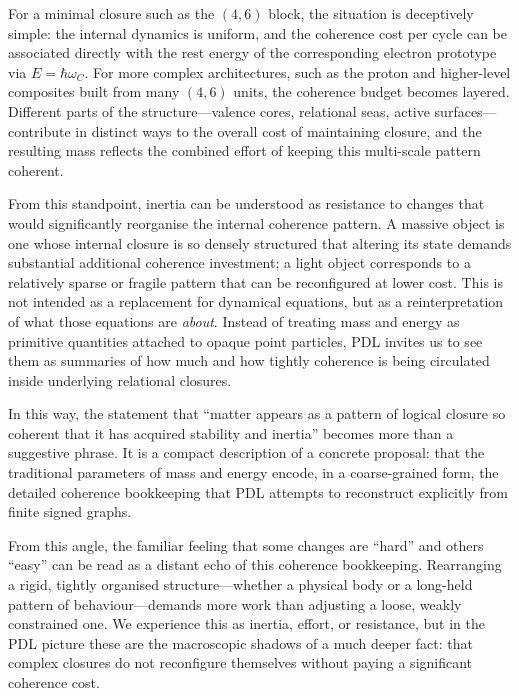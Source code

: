 \documentclass[11pt,a4paper]{article}
\theoremstyle{definition}
\begin{document}
For a minimal closure such as the \((4,6)\) block, the situation is deceptively simple: the internal dynamics is uniform, and the coherence cost per cycle can be associated directly with the rest energy of the corresponding electron prototype via \(E = \hbar \omega_C\).\cite{Laubscher_EmergencePhysicalReality_2024,Laubscher_Schrodinger_Compat_v2_2024} For more complex architectures, such as the proton and higher-level composites built from many \((4,6)\) units, the coherence budget becomes layered. Different parts of the structure---valence cores, relational seas, active surfaces---contribute in distinct ways to the overall cost of maintaining closure, and the resulting mass reflects the combined effort of keeping this multi-scale pattern coherent.\cite{Laubscher_ProtonArch_v2_2024,Laubscher_Alpha_v2_2024}

From this standpoint, inertia can be understood as resistance to changes that would significantly reorganise the internal coherence pattern. A massive object is one whose internal closure is so densely structured that altering its state demands substantial additional coherence investment; a light object corresponds to a relatively sparse or fragile pattern that can be reconfigured at lower cost.\cite{Laubscher_Existence_PulsatingClosure_2026,Laubscher_PDL_Position_2024} This is not intended as a replacement for dynamical equations, but as a reinterpretation of what those equations are \emph{about}. Instead of treating mass and energy as primitive quantities attached to opaque point particles, PDL invites us to see them as summaries of how much and how tightly coherence is being circulated inside underlying relational closures.

In this way, the statement that ``matter appears as a pattern of logical closure so coherent that it has acquired stability and inertia'' becomes more than a suggestive phrase.\cite{Laubscher_Existence_PulsatingClosure_2026} It is a compact description of a concrete proposal: that the traditional parameters of mass and energy encode, in a coarse-grained form, the detailed coherence bookkeeping that PDL attempts to reconstruct explicitly from finite signed graphs.

From this angle, the familiar feeling that some changes are “hard” and others “easy” can be read as a distant echo of this coherence bookkeeping. Rearranging a rigid, tightly organised structure—whether a physical body or a long-held pattern of behaviour—demands more work than adjusting a loose, weakly constrained one. We experience this as inertia, effort, or resistance, but in the PDL picture these are the macroscopic shadows of a much deeper fact: that complex closures do not reconfigure themselves without paying a significant coherence cost.
\end{document}
